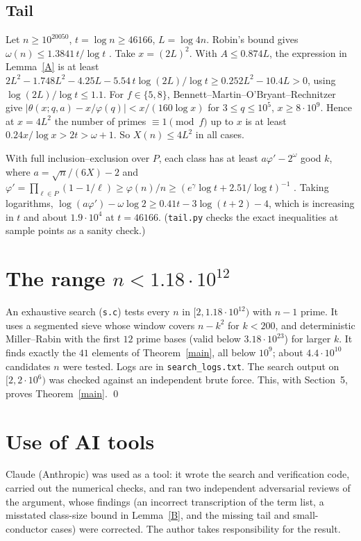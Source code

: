 \documentclass[11pt]{amsart}
\theoremstyle{remark}\newtheorem*{remark}{Remark}
\begin{document}
\subsection*{Tail} Let $n\ge10^{20050}$, $t=\log n\ge46166$, $L=\log4n$. Robin's bound gives $\omega(n)\le1.3841\,t/\log t$ \cite{Ro83}. Take $x=(2L)^2$. With $A\le0.874L$, the expression in Lemma~\ref{A} is at least
$2L^2-1.748L^2-4.25L-5.54\,t\log(2L)/\log t\ge0.252L^2-10.4L>0$,
using $\log(2L)/\log t\le1.1$. For $f\in\{5,8\}$, Bennett--Martin--O'Bryant--Rechnitzer \cite{BMOR} give $|\theta(x;q,a)-x/\varphi(q)|<x/(160\log x)$ for $3\le q\le10^5$, $x\ge8\cdot10^9$. Hence at $x=4L^2$ the number of primes $\equiv1\pmod f$ up to $x$ is at least $0.24x/\log x>2t>\omega+1$. So $X(n)\le4L^2$ in all cases.

With full inclusion--exclusion over $P$, each class has at least $a\varphi'-2^{\omega}$ good $k$, where $a=\sqrt n/(6X)-2$ and $\varphi'=\prod_{\ell\in P}(1-1/\ell)\ge\varphi(n)/n\ge(e^\gamma\log t+2.51/\log t)^{-1}$ \cite{RS62}. Taking logarithms,
$\log(a\varphi')-\omega\log2\ge0.41t-3\log(t+2)-4$, which is increasing in $t$ and about $1.9\cdot10^4$ at $t=46166$. (\texttt{tail.py} checks the exact inequalities at sample points as a sanity check.)

\section{The range $n<1.18\cdot10^{12}$}
An exhaustive search (\texttt{s.c}) tests every $n$ in $[2,1.18\cdot10^{12})$ with $n-1$ prime. It uses a segmented sieve whose window covers $n-k^2$ for $k<200$, and deterministic Miller--Rabin with the first $12$ prime bases (valid below $3.18\cdot10^{23}$) for larger $k$. It finds exactly the $41$ elements of Theorem~\ref{main}, all below $10^9$; about $4.4\cdot10^{10}$ candidates $n$ were tested. Logs are in \texttt{search\_logs.txt}. The search output on $[2,2\cdot10^6)$ was checked against an independent brute force. This, with Section~5, proves Theorem~\ref{main}. \qed

\section*{Use of AI tools}
Claude (Anthropic) was used as a tool: it wrote the search and verification code, carried out the numerical checks, and ran two independent adversarial reviews of the argument, whose findings (an incorrect transcription of the term list, a misstated class-size bound in Lemma~\ref{B}, and the missing tail and small-conductor cases) were corrected. The author takes responsibility for the result.
\end{document}
